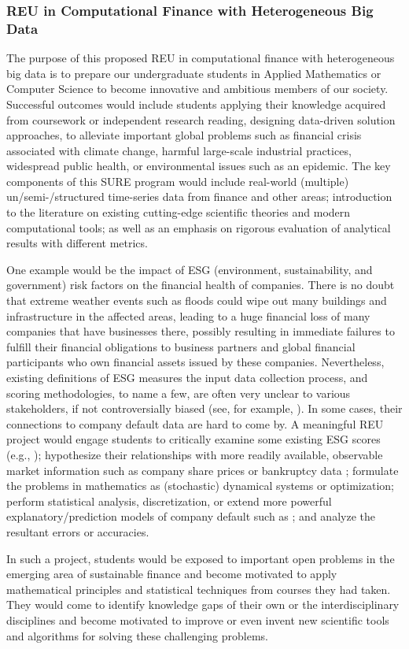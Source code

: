 
\subsubsection{ REU in Computational Finance with Heterogeneous Big Data}

The purpose of this proposed REU in computational finance with heterogeneous big data is to prepare our undergraduate students in Applied Mathematics or Computer Science to become innovative and ambitious members of our society. Successful outcomes would include students applying their knowledge acquired from coursework or independent research reading,  designing data-driven solution approaches, to alleviate important global problems such as financial crisis associated with climate change, harmful large-scale industrial practices, widespread public health, or environmental issues such as an epidemic.  The key components of this SURE program would include real-world (multiple) un/semi-/structured time-series data from finance and other areas; introduction to the literature on existing cutting-edge scientific theories and modern computational tools; as well as an emphasis on rigorous evaluation of analytical results with different metrics. 

One example would be the impact of ESG (environment, sustainability, and government) risk factors on the financial health of companies. There is no doubt that extreme weather events such as floods could wipe out many buildings and infrastructure in the affected areas, leading to a huge financial loss of many companies that have businesses there, possibly resulting in immediate failures to fulfill their financial obligations to business partners and global financial participants who own financial assets issued by these companies. Nevertheless, existing definitions of ESG measures the input data collection process, and scoring methodologies, to name a few, are often very unclear to various stakeholders, if not controversially biased (see, for example, \cite{reiser2019buyer}). In some cases, their connections to company default data are hard to come by. A meaningful REU project would engage students to critically examine some existing ESG scores (e.g., \cite{friede2015esg}); hypothesize their relationships with more readily available, observable market information such as company share prices or bankruptcy data \cite{pedersen2020responsible, fatemi2018esg}; formulate the problems in mathematics as (stochastic) dynamical systems or optimization; perform statistical analysis, discretization, or extend more powerful explanatory/prediction models of company default such as \cite{jarrow2005default}; and analyze the resultant errors or accuracies. 

In such a project, students would be exposed to important open problems in the emerging area of sustainable finance and become motivated to apply mathematical principles and statistical techniques from courses they had taken. They would come to identify knowledge gaps of their own or the interdisciplinary disciplines and become motivated to improve or even invent new scientific tools and algorithms for solving these challenging problems.
